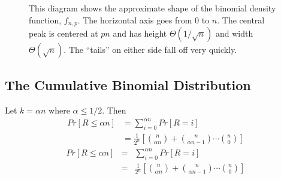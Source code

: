 \documentclass[11pt,twoside]{article}
\begin{document}
\begin{figure}
  \centerline{}
  \caption{This diagram shows the approximate shape of the binomial
    density function, $f_{n,p}$.  The horizontal axis goes from
    0 to $n$.  The central peak is
    centered at $pn$ and has height
    $\Theta(1/\sqrt{n})$ and width
    $\Theta(\sqrt{n})$.  The ``tails'' on either side fall off very
    quickly.}
  \label{fig:binom}
\end{figure}

\iffalse

\subsection{The Cumulative Binomial Distribution}

Let $k = \alpha n$ where $\alpha \le 1/2$. Then
\begin{align*}
Pr[R\leq \alpha n]
 &= \sum_{i=0}^{\alpha n} Pr[R=i] \\
 &= \frac{1}{2^n}\left[ \binom{n}{\alpha n}+\binom{n}{\alpha n - 1}
 \cdots \binom{n}{0} \right]
\end{align*}
\begin{eqnarray*}
Pr[R\leq \alpha n]
  &=& \sum_{i=0}^{\alpha n} Pr[R=i] \\
  &=& \frac{1}{2^n}\left[ \binom{n}{\alpha n}+\binom{n}{\alpha n - 1}
  \cdots \binom{n}{0} \right]
\end{eqnarray*}
\end{document}

